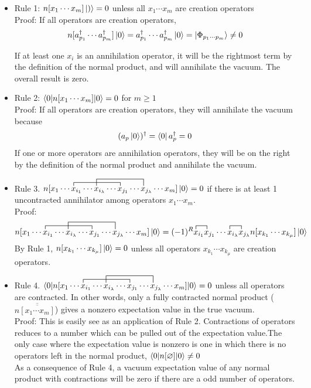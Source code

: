 \documentclass{article}
\newcommand{\ol}{\overline}
\newcommand{\dg}{\ensuremath{^\dagger} }
\newcommand{\cd}{\ensuremath{\cdots} }
\begin{document}
\begin{itemize}
\item Rule 1: $n[x_1 \cd x_m]\ket{)} = 0$ unless all $x_1 \cd x_m$ are creation operators \\

Proof: If all operators are creation operators, 
\[n[a_{p_1}\dg \cd a_{p_m}\dg]\ket{0} = a_{p_1}\dg \cd a_{p_m}\dg\ket{0} = \ket{\Phi_{p_1 \cd p_m}} \neq 0\]

If at least one $x_i$ is an annihilation operator, it will be the rightmost term by the definition of the normal product, and will annihilate the vacuum.
The overall result is zero.  
\item Rule 2: $\braket{0 | n[x_1 \cd x_m] | 0} = 0$ for  $m \geq 1$ \\

Proof: If all operators are creation operators, they will annihilate the vacuum because 
\[(a_p\ket{0})\dg = \bra{0}a_p\dg = 0\]
If one or more operators are annihilation operators, they will be on the right by the definition of the normal product and annihilate the vacuum. 
\item Rule 3. $\contraction{n[x_1 \cd }{x}{{}_{i_1} \cd x_{i_\lambda} \cd }{x}
\contraction[2ex]{n[x_1 \cd x_{i_1} \cd}{ x}{{}_{i_\lambda} \cd x_{j_1} \cd }{x} 
n[x_1 \cd x_{i_1} \cd x_{i_\lambda} \cd x_{j_1} \cd x_{j_\lambda} \cd x_m] \ket{0} = 0$ if there is at least 1 uncontracted annihilator among operators $x_1 \cd x_m$.  \\

Proof:
\[ 
\contraction{n[x_1 \cd }{x}{{}_{i_1} \cd x_{i_\lambda} \cd }{x}
\contraction[2ex]{n[x_1 \cd x_{i_1} \cd}{ x}{{}_{i_\lambda} \cd x_{j_1} \cd }{x} 
n[x_1 \cd x_{i_1} \cd x_{i_\lambda} \cd x_{j_1} \cd x_{j_\lambda} \cd x_m] \ket{0}
= 
\contraction{(-1)^R}{x}{{}_{i_1} }{x}
\contraction{(-1)^R x_{i_1}x_{j_1} \cd}{x}{{}_{i_\lambda} }{x}
(-1)^R x_{i_1}x_{j_1} \cd x_{i_\lambda} x_{j_\lambda} n[x_{k_1} \cd x_{k_\mu}] \ket{0}
\] 
By Rule 1, $n[x_{k_1} \cd x_{k_\mu}] \ket{0} = 0$ unless all operators $x_{k_1} \cd x_{k_\mu}$ are creation operators. 
\item Rule 4. $\braket{0| \contraction{n[x_1 \cd }{x}{{}_{i_1} \cd x_{i_\lambda} \cd }{x}
\contraction[2ex]{n[x_1 \cd x_{i_1} \cd}{ x}{{}_{i_\lambda} \cd x_{j_1} \cd }{x} 
n[x_1 \cd x_{i_1} \cd x_{i_\lambda} \cd x_{j_1} \cd x_{j_\lambda} \cd x_m] |0} = 0$ unless all operators are contracted. 
In other words, only a fully contracted normal product ($n\ol{\ol{[x_1 \cd x_m] }}$) gives a nonzero expectation value in the true vacuum. \\

Proof: This is easily see as an application of Rule 2. Contractions of operators reduces to a number which can be pulled out of the expectation value.The only case where the expectation value is nonzero is one in which there is no operators left in the normal product, $\braket{0 | n[\varnothing] | 0} \neq 0$ \\

As a consequence of Rule 4, a vacuum expectation value of any normal product with contractions will be zero if there are a odd number of operators. 
\end{itemize}
\end{document}
